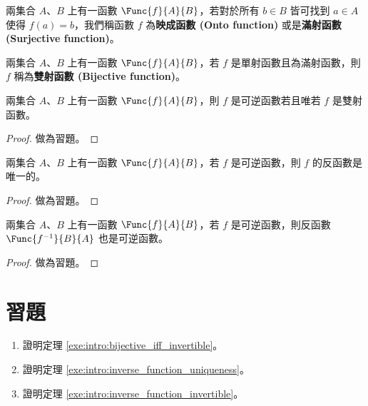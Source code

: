 \documentclass[12pt,a4paper,oneside]{report}
\begin{document}
\begin{CJK}{UTF8}{bkai}
\begin{mydef}[滿射函數]
\label{def:intro:surjective_function}
兩集合 $A$、$B$ 上有一函數 $\Func{f}{A}{B}$，若對於所有 $b\in{B}$ 皆可找到 $a\in{A}$ 使得 $f(a)=b$，我們稱函數 $f$ 為\textbf{映成函數 (Onto function)} 或是\textbf{滿射函數 (Surjective function)}。
\end{mydef}

\begin{mydef}[雙射函數]
\label{def:intro:bijective_function}
兩集合 $A$、$B$ 上有一函數 $\Func{f}{A}{B}$，若 $f$ 是單射函數且為滿射函數，則 $f$ 稱為\textbf{雙射函數 (Bijective function)}。
\end{mydef}

\begin{mythm}
\label{thm:intro:bijective_iff_invertible}
\label{exe:intro:bijective_iff_invertible}
兩集合 $A$、$B$ 上有一函數 $\Func{f}{A}{B}$，則 $f$ 是可逆函數若且唯若 $f$ 是雙射函數。
\end{mythm}
\begin{proof}
做為習題。
\end{proof}

\begin{mythm}[反函數唯一性]
\label{thm:intro:inverse_function_uniqueness}
\label{exe:intro:inverse_function_uniqueness}
兩集合 $A$、$B$ 上有一函數 $\Func{f}{A}{B}$，若 $f$ 是可逆函數，則 $f$ 的反函數是唯一的。
\end{mythm}
\begin{proof}
做為習題。
\end{proof}

\begin{mythm}
\label{thm:intro:inverse_function_invertible}
\label{exe:intro:inverse_function_invertible}
兩集合 $A$、$B$ 上有一函數 $\Func{f}{A}{B}$，若 $f$ 是可逆函數，則反函數 $\Func{f^{-1}}{B}{A}$ 也是可逆函數。
\end{mythm}
\begin{proof}
做為習題。
\end{proof}

\section*{習題}

\begin{enumerate}
\item 證明定理 \ref{exe:intro:bijective_iff_invertible}。
\item 證明定理 \ref{exe:intro:inverse_function_uniqueness}。
\item 證明定理 \ref{exe:intro:inverse_function_invertible}。
\end{enumerate}

\ifx \allfiles \undefined
\printindex[noun]

\clearpage
\end{CJK}
\end{document}
